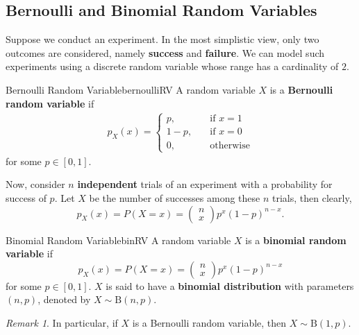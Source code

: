 \documentclass[math]{amznotes}
\theoremstyle{remark}
\newtheorem*{remark}{Remark}
\begin{document}
\subsection{Bernoulli and Binomial Random Variables}
Suppose we conduct an experiment. In the most simplistic view, only two outcomes are considered, namely \textbf{success} and \textbf{failure}. We can model such experiments using a discrete random variable whose range has a cardinality of $2$.
\begin{dfnbox}{Bernoulli Random Variable}{bernoulliRV}
    A random variable $X$ is a {\color{red} \textbf{Bernoulli random variable}} if
    \begin{align*}
        p_X(x) = \begin{cases}
            p, \quad & \textrm{if } x = 1 \\
            1 - p, \quad & \textrm{if } x = 0 \\
            0, \quad & \textrm{otherwise}
        \end{cases}
    \end{align*}
    for some $p \in [0, 1]$.
\end{dfnbox}
Now, consider $n$ \textbf{independent} trials of an experiment with a probability for success of $p$. Let $X$ be the number of successes among these $n$ trials, then clearly,
\begin{equation*}
    p_X(x) = P(X = x) = \begin{pmatrix}
        n \\
        x
    \end{pmatrix}p^x(1 - p)^{n - x}.
\end{equation*}
\begin{dfnbox}{Binomial Random Variable}{binRV}
    A random variable $X$ is a {\color{red} \textbf{binomial random variable}} if
    \begin{equation*}
        p_X(x) = P(X = x) = \begin{pmatrix}
            n \\
            x
        \end{pmatrix}p^x(1 - p)^{n - x}
    \end{equation*}
    for some $p \in [0, 1]$. $X$ is said to have a {\color{red} \textbf{binomial distribution}} with parameters $(n, p)$, denoted by $X \sim \mathrm{B}(n, p)$.
\end{dfnbox}
\begin{notebox}
    \begin{remark}
        In particular, if $X$ is a Bernoulli random variable, then $X \sim \mathrm{B}(1, p)$.
    \end{remark}
\end{notebox}
\end{document}
